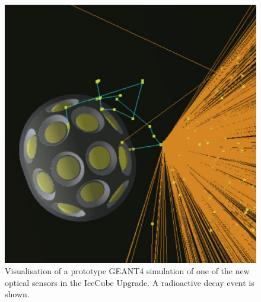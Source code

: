 \documentclass[a4paper,11pt]{article}
\begin{document}
\begin{figure} %
    \centering
    \includegraphics[trim=0.0cm 0.0cm 0.cm 1.0cm, clip=true, width=\linewidth]{images/mDOM_noise.png}
    \caption{Visualisation of a prototype GEANT4 simulation of one of the new optical sensors in the IceCube Upgrade. A radioactive decay event is shown.}
    \label{fig:mDOM_sim}
\end{figure}
\end{document}
